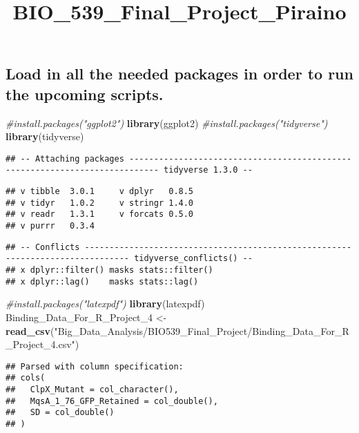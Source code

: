 \documentclass[]{article}
\title{BIO\_539\_Final\_Project\_Piraino}
\author{}
\date{\vspace{-2.5em}}
\newenvironment{Shaded}{\begin{snugshade}}{\end{snugshade}}
\newcommand{\CommentTok}[1]{\textcolor[rgb]{0.56,0.35,0.01}{\textit{#1}}}
\newcommand{\DecValTok}[1]{\textcolor[rgb]{0.00,0.00,0.81}{#1}}
\newcommand{\KeywordTok}[1]{\textcolor[rgb]{0.13,0.29,0.53}{\textbf{#1}}}
\newcommand{\NormalTok}[1]{#1}
\newcommand{\StringTok}[1]{\textcolor[rgb]{0.31,0.60,0.02}{#1}}
\begin{document}
\maketitle

\hypertarget{load-in-all-the-needed-packages-in-order-to-run-the-upcoming-scripts.}{%
\subsection{Load in all the needed packages in order to run the upcoming
scripts.}\label{load-in-all-the-needed-packages-in-order-to-run-the-upcoming-scripts.}}

\begin{Shaded}
\begin{Highlighting}[]
\CommentTok{#install.packages("ggplot2")}
\KeywordTok{library}\NormalTok{(ggplot2)}
\CommentTok{#install.packages("tidyverse")}
\KeywordTok{library}\NormalTok{(tidyverse)}
\end{Highlighting}
\end{Shaded}

\begin{verbatim}
## -- Attaching packages ---------------------------------------------------------------------------- tidyverse 1.3.0 --
\end{verbatim}

\begin{verbatim}
## v tibble  3.0.1     v dplyr   0.8.5
## v tidyr   1.0.2     v stringr 1.4.0
## v readr   1.3.1     v forcats 0.5.0
## v purrr   0.3.4
\end{verbatim}

\begin{verbatim}
## -- Conflicts ------------------------------------------------------------------------------- tidyverse_conflicts() --
## x dplyr::filter() masks stats::filter()
## x dplyr::lag()    masks stats::lag()
\end{verbatim}

\begin{Shaded}
\begin{Highlighting}[]
\CommentTok{#install.packages("latexpdf")}
\KeywordTok{library}\NormalTok{(latexpdf)}
\NormalTok{Binding_Data_For_R_Project_}\DecValTok{4}\NormalTok{ <-}\StringTok{ }\KeywordTok{read_csv}\NormalTok{(}\StringTok{"Big_Data_Analysis/BIO539_Final_Project/Binding_Data_For_R_Project_4.csv"}\NormalTok{)}
\end{Highlighting}
\end{Shaded}

\begin{verbatim}
## Parsed with column specification:
## cols(
##   ClpX_Mutant = col_character(),
##   MqsA_1_76_GFP_Retained = col_double(),
##   SD = col_double()
## )
\end{verbatim}
\end{document}

